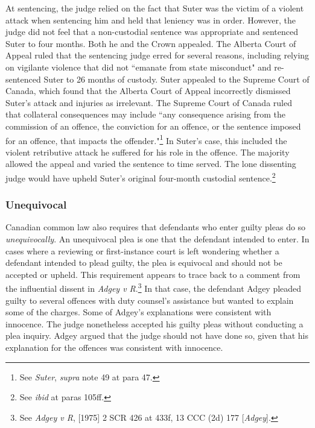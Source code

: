 At sentencing, the judge relied on the fact that Suter was the victim of a violent attack when sentencing him and held that leniency was in order. However, the judge did not feel that a non-custodial sentence was appropriate and sentenced Suter to four months. Both he and the Crown appealed. The Alberta Court of Appeal ruled that the sentencing judge erred for several reasons, including relying on vigilante violence that did not ``emanate from state misconduct" and re-sentenced Suter to 26 months of custody. Suter appealed to the Supreme Court of Canada, which found that the Alberta Court of Appeal incorrectly dismissed Suter's attack and injuries as irrelevant. The Supreme Court of Canada ruled that collateral consequences may include ``any consequence arising from the commission of an offence, the conviction for an offence, or the sentence imposed for an offence, that impacts the offender."\footnote{See \textit{Suter}, \textit{supra} note 49 at para 47.} In Suter's case, this included the violent retributive attack he suffered for his role in the offence. The majority allowed the appeal and varied the sentence to time served. The lone dissenting judge would have upheld Suter's original four-month custodial sentence.\footnote{See \textit{ibid} at paras 105ff.}

\subsubsection{Unequivocal}

Canadian common law also requires that defendants who enter guilty pleas do so \textit{unequivocally}. An unequivocal plea is one that the defendant intended to enter. In cases where a reviewing or first-instance court is left wondering whether a defendant intended to plead guilty, the plea is equivocal and should not be accepted or upheld. This requirement appears to trace back to a comment from the influential dissent in \textit{Adgey v R}.\footnote{See \textit{Adgey v R}, [1975] 2 SCR 426 at 433f, 13 CCC (2d) 177 [\textit{Adgey}].} In that case, the defendant Adgey pleaded guilty to several offences with duty counsel's assistance but wanted to explain some of the charges. Some of Adgey's explanations were consistent with innocence. The judge nonetheless accepted his guilty pleas without conducting a plea inquiry. Adgey argued that the judge should not have done so, given that his explanation for the offences was consistent with innocence. 


